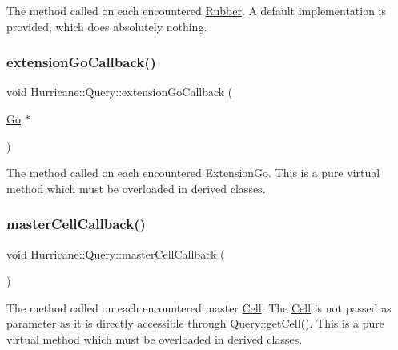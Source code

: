 The method called on each encountered \mbox{\hyperlink{classHurricane_1_1Rubber}{Rubber}}. A default implementation is provided, which does absolutely nothing. \mbox{\label{classHurricane_1_1Query_a75b87e969b64caaf24ec058c0d2dfa68}} 
\subsubsection{\texorpdfstring{extension\+Go\+Callback()}{extensionGoCallback()}}
{\footnotesize\ttfamily void Hurricane\+::\+Query\+::extension\+Go\+Callback (\begin{DoxyParamCaption}\item[{\mbox{\hyperlink{classHurricane_1_1Go}{Go}} $\ast$}]{ }\end{DoxyParamCaption})\hspace{0.3cm}{\ttfamily [pure virtual]}}

The method called on each encountered Extension\+Go. This is a pure virtual method which must be overloaded in derived classes. \mbox{\label{classHurricane_1_1Query_abaf97e93c7fa96469adf64f7865938b4}} 
\subsubsection{\texorpdfstring{master\+Cell\+Callback()}{masterCellCallback()}}
{\footnotesize\ttfamily void Hurricane\+::\+Query\+::master\+Cell\+Callback (\begin{DoxyParamCaption}{ }\end{DoxyParamCaption})\hspace{0.3cm}{\ttfamily [pure virtual]}}

The method called on each encountered master \mbox{\hyperlink{classHurricane_1_1Cell}{Cell}}. The \mbox{\hyperlink{classHurricane_1_1Cell}{Cell}} is not passed as parameter as it is directly accessible through Query\+::get\+Cell(). This is a pure virtual method which must be overloaded in derived classes. \mbox{\label{classHurricane_1_1Query_a70fce1e5b7754f1ec11097ad5b9ecfc9}} 
